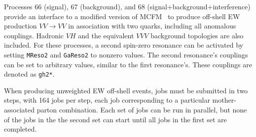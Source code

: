 \documentclass[aps,superscriptaddress,nofootinbib]{revtex4}
\begin{document}
Processes 66 (signal), 67 (background), and 68 (signal+background+interference) provide an interface to a modified version of MCFM~\cite{Campbell:2010ff} to produce off-shell EW production $VV\to VV$ in association with two quarks, including all anomalous couplings.  Hadronic $VH$ and the equivalent $VVV$ background topologies are also included. For these processes, a second spin-zero resonance can be activated by setting \verb|MReso2| and \verb|GaReso2| to nonzero values.  The second resonance's couplings can be set to arbitrary values, similar to the first resonance's. These couplings are denoted as \verb|gh2*|.

When producing unweighted EW off-shell events, jobs must be submitted in two steps, with 164 jobs per step, each job corresponding to a particular mother-associated parton combination.  Each set of jobs can be run in parallel, but none of the jobs in the the second set can start until all jobs in the first set are completed.
\end{document}
